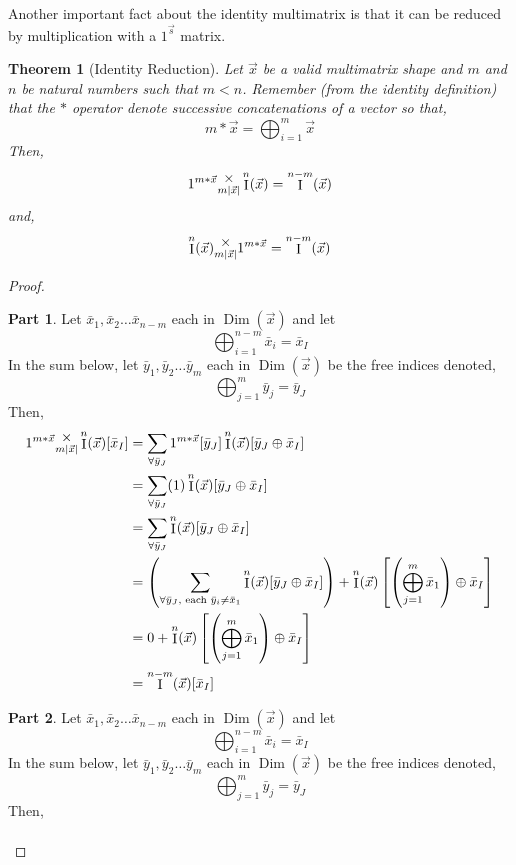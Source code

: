 \documentclass[12pt]{book}
\theoremstyle{plain}
\newtheorem{theorem}{Theorem}[chapter]
\theoremstyle{definition}
\theoremstyle{ppart}
\newtheorem{ppart}{Part}
\theoremstyle{case}
\theoremstyle{solution}
\DeclareMathOperator{\Dim}{Dim}
\DeclareMathOperator{\Ident}{I}
\newcommand{\mmult}[1]{\text{\raisebox{1ex}{$\underset{#1}{\times}$}}}
\newcommand{\shape}[1]{\left|#1\right|}
\begin{document}
Another important fact about the identity multimatrix is that it can be
reduced by multiplication with a $1^{\vec{s}}$ matrix.

\begin{theorem}[Identity Reduction]
Let $\vec{x}$ be a valid multimatrix shape and $m$ and $n$ be natural numbers
such that $m < n$.
Remember (from the identity definition) that the $*$ operator denote successive
concatenations of a vector so that,
\[ m*\vec{x} = \bigoplus_{i=1}^{m} \vec{x} \]
Then,
\[1^{m*\vec{x}} \mmult{m \shape{\vec{x}}} \Ident^n(\vec{x}) = \Ident^{n-m}(\vec{x})\]
and,
\[\Ident^n(\vec{x}) \mmult{m \shape{\vec{x}}} 1^{m*\vec{x}} = \Ident^{n-m}(\vec{x})\]
\end{theorem}
\begin{proof}
\begin{ppart}
Let $\bar{x}_1, \bar{x}_2 \ldots  \bar{x}_{n-m}$ each in $\Dim(\vec{x})$ and let
\[\bigoplus_{i = 1}^{n-m} \bar{x}_i = \bar{x}_I \]
In the sum below, let $\bar{y}_1, \bar{y}_2 \ldots \bar{y}_m$ each in $\Dim(\vec{x})$ be the
free indices denoted,
\[\bigoplus_{j = 1}^m \bar{y}_j = \bar{y}_J \]
Then,
\begin{align*}
  1^{m*\vec{x}} \mmult{m \shape{\vec{x}}} \Ident^n(\vec{x}) [\bar{x}_I] &=
  \sum_{\forall \bar{y}_J} 1^{m*\vec{x}}[\bar{y}_J] \Ident^n(\vec{x})[\bar{y}_J \oplus \bar{x}_I] \\
  &=
  \sum_{\forall \bar{y}_J} (1) \Ident^n(\vec{x})[\bar{y}_J \oplus \bar{x}_I] \\
  &=
  \sum_{\forall \bar{y}_J} \Ident^n(\vec{x})[\bar{y}_J \oplus \bar{x}_I] \\
  &=
  \left(
    \sum_{\forall \bar{y}_J, \text{ each } \bar{y}_i \ne \bar{x}_1} \Ident^n(\vec{x})[\bar{y}_J \oplus \bar{x}_I]
  \right)
  + \Ident^n(\vec{x})\left[\left( \bigoplus_{j=1}^m \bar{x}_1 \right) \oplus \bar{x}_I\right] \\
  &= 0 + \Ident^n(\vec{x})\left[\left( \bigoplus_{j=1}^m \bar{x}_1 \right) \oplus \bar{x}_I\right] \\
  &= \Ident^{n-m}(\vec{x})[\bar{x}_I]
\end{align*}
\end{ppart}
\begin{ppart}
Let $\bar{x}_1, \bar{x}_2 \ldots \bar{x}_{n-m}$ each in $\Dim(\vec{x})$ and let
\[\bigoplus_{i = 1}^{n-m} \bar{x}_i = \bar{x}_I \]
In the sum below, let $\bar{y}_1, \bar{y}_2 \ldots \bar{y}_m$ each in $\Dim(\vec{x})$ be the
free indices denoted,
\[\bigoplus_{j = 1}^m \bar{y}_j = \bar{y}_J \]
Then,
\begin{align*}

\end{align*}
\end{ppart}
\end{proof}
\end{document}
